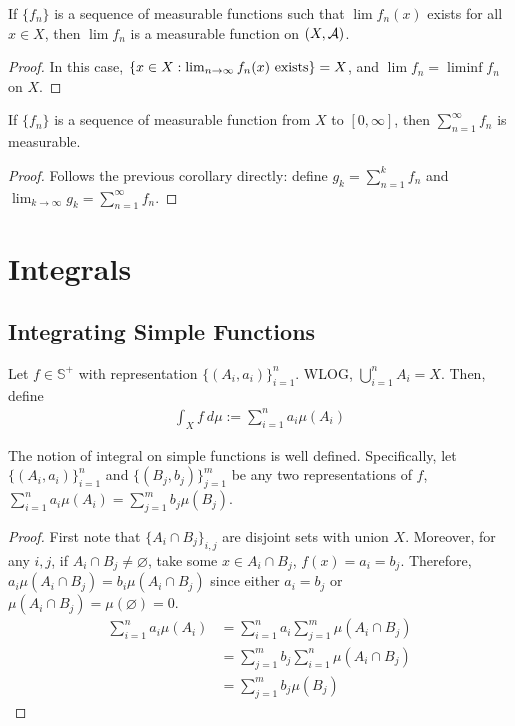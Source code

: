 \documentclass[11pt]{article}
\begin{document}
	\begin{corollary}
		If $\{f_n\}$ is a sequence of measurable functions such that $\lim f_n(x)$ exists for all $x \in X$, then $\lim f_n$ is a measurable function on $(X, \mathcal{{A}})$.
		\begin{proof}
			In this case, $\{x \in X : \lim_{n \to \infty} f_n(x) \text{{ exists}}\} = X$, and $\lim f_n = \liminf f_n$ on $X$.
		\end{proof}
	\end{corollary}
	
	\begin{corollary}
		If $\{f_n\}$ is a sequence of measurable function from $X$ to $[0, \infty]$, then $\sum_{n=1}^\infty f_n$ is measurable.
		\begin{proof}
			Follows the previous corollary directly: define $g_k = \sum_{n=1}^k f_n$ and $\lim_{k \to \infty} g_k = \sum_{n=1}^\infty f_n$.
		\end{proof}
	\end{corollary}

	\section{Integrals}
	\subsection{Integrating Simple Functions}
	\begin{definition}
		Let $f \in \mathds{S}^+$ with representation $\{(A_i, a_i)\}_{i=1}^n$. WLOG, $\bigcup_{i=1}^n A_i = X$. Then, define
		\begin{align}
			\int_X f \ d\mu := \sum_{i=1}^n a_i \mu(A_i)
		\end{align}
	\end{definition}
	
	\begin{proposition}
		The notion of integral on simple functions is well defined. Specifically, let $\{(A_i, a_i)\}_{i=1}^n$ and $\{(B_j, b_j)\}_{j=1}^m$ be any two representations of $f$, $\sum_{i=1}^n a_i \mu(A_i) = \sum_{j=1}^m b_j \mu(B_j)$.
		\begin{proof}
			First note that $\{A_i \cap B_j\}_{i, j}$ are disjoint sets with union $X$. Moreover, for any $i, j$, if $A_i \cap B_j \neq \varnothing$, take some $x \in A_i \cap B_j$, $f(x) = a_i = b_j$. Therefore, $a_i \mu(A_i \cap B_j) = b_i \mu(A_i \cap B_j)$ since either $a_i = b_j$ or $\mu(A_i \cap B_j) = \mu(\varnothing) = 0$.
			\begin{align}
				\sum_{i=1}^n a_i \mu(A_i) &= \sum_{i=1}^n a_i \sum_{j=1}^m \mu(A_i \cap B_j) \\
				&= \sum_{j=1}^m b_j \sum_{i=1}^n \mu(A_i \cap B_j) \\
				&= \sum_{j=1}^m b_j \mu(B_j)
			\end{align}
		\end{proof}
	\end{proposition}
	
\end{document}
